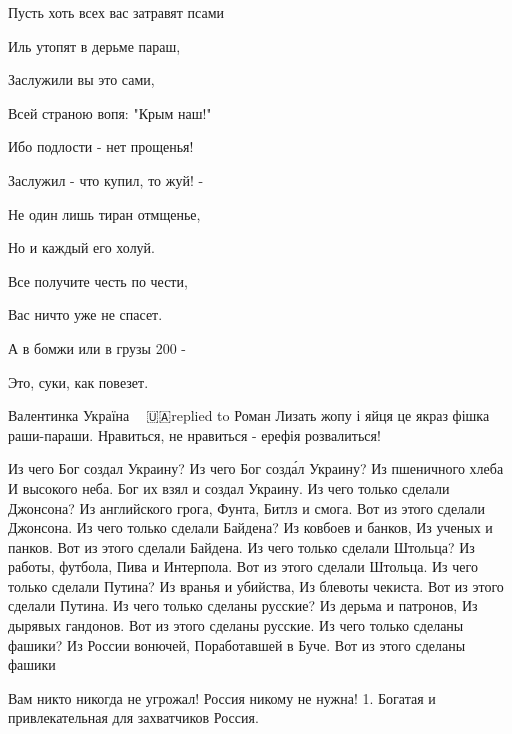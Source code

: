 Пусть хоть всех вас затравят псами

Иль утопят в дерьме параш,

Заслужили вы это сами,

Всей страною вопя: "Крым наш!"

Ибо подлости - нет прощенья!

Заслужил - что купил, то жуй! -

Не один лишь тиран отмщенье,

Но и каждый его холуй.

Все получите честь по чести,

Вас ничто уже не спасет.

А в бомжи или в грузы 200 -

Это, суки, как повезет.

Валентинка Україна 💙💛 🇺🇦replied to Роман
Лизать жопу і яйця це якраз фішка раши-параши. Нравиться, не нравиться - ерефія розвалиться!

Из чего Бог создал Украину?
Из чего Бог созда́л Украину?
Из пшеничного хлеба
И высокого неба.
Бог их взял и создал Украину.
Из чего только сделали Джонсона?
Из английского грога,
Фунта, Битлз и смога.
Вот из этого сделали Джонсона.
Из чего только сделали Байдена?
Из ковбоев и банков,
Из ученых и панков.
Вот из этого сделали Байдена.
Из чего только сделали Штольца?
Из работы, футбола,
Пива и Интерпола.
Вот из этого сделали Штольца.
Из чего только сделали Путина?
Из вранья и убийства,
Из блевоты чекиста.
Вот из этого сделали Путина.
Из чего только сделаны русские?
Из дерьма и патронов,
Из дырявых гандонов.
Вот из этого сделаны русские.
Из чего только сделаны фашики?
Из России вонючей,
Поработавшей в Буче.
Вот из этого сделаны фашики

Вам никто никогда не угрожал! Россия никому не нужна! 1. Богатая и привлекательная
для захватчиков Россия.


